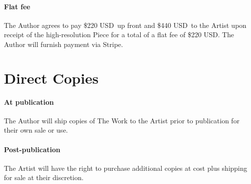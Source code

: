 \documentclass[12pt,letterpaper]{article}
\def\UpFront{\$220 USD}
\def\AtCompletion{\$440 USD}
\def\FlatFee{\$220 USD}
\def\PrintRoyalties{25\%}
\def\DigitalRoyalties{50\%}
\def\PaymentMechanism{Stripe} %
\begin{document}
\paragraph{Flat fee}

The Author agrees to pay \UpFront\ up front and \AtCompletion\ to the Artist upon receipt of the high-resolution Piece for a total of a flat fee of \FlatFee. The Author will furnish payment via \PaymentMechanism.

%
%
%
%
%
%
%

\section{Direct Copies}

\paragraph{At publication} The Author will ship copies of The Work to the Artist prior to publication for their own sale or use.

\paragraph{Post-publication} The Artist will have the right to purchase additional copies at cost plus shipping for sale at their discretion.
\end{document}
